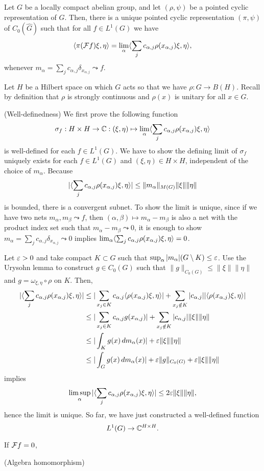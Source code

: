 \documentclass[a4paper]{article}
\begin{document}
\begin{thm}
Let $G$ be a locally compact abelian group, and let $(\rho,\psi)$ be a pointed cyclic representation of $G$.
Then, there is a unique pointed cyclic representation $(\pi,\psi)$ of $C_0(\hat G)$ such that for all $f\in L^1(G)$ we have
\[\langle\pi(\mathcal{F} f)\xi,\eta\rangle=\lim_\alpha\langle\sum_jc_{\alpha,j}\rho(x_{\alpha,j})\xi,\eta\rangle,\]
whenever $m_\alpha=\sum_jc_{\alpha,j}\delta_{x_{\alpha,j}}\leadsto f$.
\end{thm}
\begin{pf}
Let $H$ be a Hilbert space on which $G$ acts so that we have $\rho:G\to B(H)$.
Recall by definition that $\rho$ is strongly continuous and $\rho(x)$ is unitary for all $x\in G$.

(Well-definedness)
We first prove the following function
\[\sigma_f:H\times H\to\mathbb{C}:(\xi,\eta)\mapsto\lim_\alpha\langle\sum_jc_{\alpha,j}\rho(x_{\alpha,j})\xi,\eta\rangle\]
is well-defined for each $f\in L^1(G)$.
We have to show the defining limit of $\sigma_f$ uniquely exists for each $f\in L^1(G)$ and $(\xi,\eta)\in H\times H$, independent of the choice of $m_\alpha$.
Because
\[|\langle\sum_jc_{\alpha,j}\rho(x_{\alpha,j})\xi,\eta\rangle|\le\|m_\alpha\|_{M(G)}\|\xi\|\|\eta\|\]
is bounded, there is a convergent subnet.
To show the limit is unique, since if we have two nets $m_\alpha,m_\beta\leadsto f$, then $(\alpha,\beta)\mapsto m_\alpha-m_\beta$ is also a net with the product index set such that $m_\alpha-m_\beta\leadsto 0$, it is enough to show $m_\alpha=\sum_jc_{\alpha,j}\delta_{x_{\alpha,j}}\leadsto0$ implies $\lim_\alpha\langle\sum_jc_{\alpha,j}\rho(x_{\alpha,j})\xi,\eta\rangle=0$.

Let $\varepsilon>0$ and take compact $K\subset G$ such that $\sup_\alpha|m_\alpha|(G\setminus K)\le\varepsilon$.
Use the Urysohn lemma to construct $g\in C_0(G)$ such that $\|g\|_{C_0(G)}\le\|\xi\|\|\eta\|$ and $g=\omega_{\xi,\eta}\circ\rho$ on $K$.
Then,
\begin{align*}
|\langle\sum_jc_{\alpha,j}\rho(x_{\alpha,j})\xi,\eta\rangle|
&\le|\sum_{x_j\in K}c_{\alpha,j}\langle\rho(x_{\alpha,j})\xi,\eta\rangle|+\sum_{x_j\notin K}|c_{\alpha,j}||\langle\rho(x_{\alpha,j})\xi,\eta\rangle|\\
&\le|\sum_{x_j\in K}c_{\alpha,j}g(x_{\alpha,j})|+\sum_{x_j\notin K}|c_{\alpha,j}|\|\xi\|\|\eta\|\\
&\le|\int_K g(x)\,dm_\alpha(x)|+\varepsilon\|\xi\|\|\eta\|\\
&\le|\int_G g(x)\,dm_\alpha(x)|+\varepsilon\|g\|_{C_0(G)}+\varepsilon\|\xi\|\|\eta\|
\end{align*}
implies
\[\limsup_\alpha|\langle\sum_jc_{\alpha,j}\rho(x_{\alpha,j})\xi,\eta\rangle|\le2\varepsilon\|\xi\|\|\eta\|,\]
hence the limit is unique.
So far, we have just constructed a well-defined function
\[L^1(G)\to\mathbb{C}^{H\times H}.\]

If $\mathcal{F} f=0$,

(Algebra homomorphism)


\end{pf}
\end{document}
